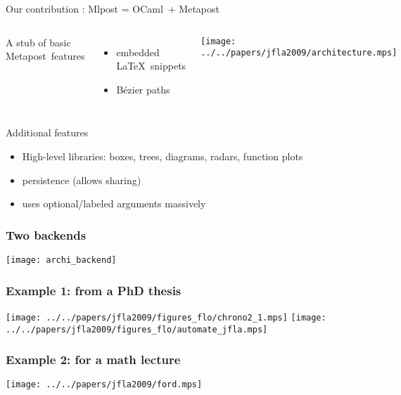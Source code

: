 \documentclass[nodefaultblocks]{beamer}
\newcommand{\ocaml}{OCaml}
\newcommand{\metapost}{Metapost}
\begin{document}
\begin{frame}{Our contribution : Mlpost = \ocaml\ + \metapost}

  \begin{columns}
  A stub of basic \metapost\ features
  \begin{itemize}
    \item embedded \LaTeX\ snippets
      \item Bézier paths
  \end{itemize}

  \texttt{[image: ../../papers/jfla2009/architecture.mps]}
  \end{columns}
  \bigskip
  Additional features
  \begin{itemize}
    \item High-level libraries: boxes, trees, diagrams, radars, function plots
  \item persistence (allows sharing) 
  \item uses optional/labeled arguments massively
  \end{itemize}

\end{frame}

\begin{frame}
  \frametitle{Two backends}
  \begin{center}
  \texttt{[image: archi\_backend]}
  \end{center}
\end{frame}

\begin{frame}
  \frametitle{Example 1: from a PhD thesis}
  \texttt{[image: ../../papers/jfla2009/figures\_flo/chrono2\_1.mps]}
  \texttt{[image: ../../papers/jfla2009/figures\_flo/automate\_jfla.mps]}
\end{frame}

\begin{frame}
\frametitle{Example 2: for a math lecture}
\begin{center}
  \texttt{[image: ../../papers/jfla2009/ford.mps]} 
\end{center}
\end{frame}
\end{document}

